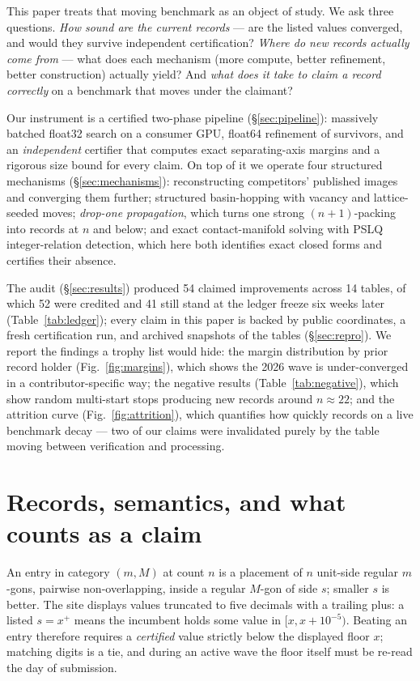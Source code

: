 \documentclass[11pt]{article}
\newcommand{\s}{\ensuremath{s}}
\begin{document}
This paper treats that moving benchmark as an object of study. We ask three
questions. \emph{How sound are the current records} --- are the listed values
converged, and would they survive independent certification?
\emph{Where do new records actually come from} --- what does each mechanism
(more compute, better refinement, better construction) actually yield? And
\emph{what does it take to claim a record correctly} on a benchmark that moves
under the claimant?

Our instrument is a certified two-phase pipeline (\S\ref{sec:pipeline}):
massively batched float32 search on a consumer GPU, float64 refinement of
survivors, and an \emph{independent} certifier that computes exact
separating-axis margins and a rigorous size bound for every claim. On top of it
we operate four structured mechanisms (\S\ref{sec:mechanisms}): reconstructing
competitors' published images and converging them further; structured
basin-hopping with vacancy and lattice-seeded moves; \emph{drop-one
propagation}, which turns one strong $(n{+}1)$-packing into records at $n$ and
below; and exact contact-manifold solving with PSLQ integer-relation detection,
which here both identifies exact closed forms and certifies their absence.

The audit (\S\ref{sec:results}) produced 54 claimed improvements across 14
tables, of which 52 were credited and 41 still stand at the ledger freeze six
weeks later (Table~\ref{tab:ledger}); every claim in this paper is backed by
public coordinates, a fresh certification run, and archived snapshots of the
tables (\S\ref{sec:repro}). We report the findings a trophy list would hide:
the margin distribution by prior record holder (Fig.~\ref{fig:margins}), which
shows the 2026 wave is under-converged in a contributor-specific way; the
negative results (Table~\ref{tab:negative}), which show random multi-start
stops producing new records around $n\approx22$; and the attrition curve
(Fig.~\ref{fig:attrition}), which quantifies how quickly records on a live
benchmark decay --- two of our claims were invalidated purely by the table
moving between verification and processing.

\section{Records, semantics, and what counts as a claim}\label{sec:semantics}

An entry in category $(m, M)$ at count $n$ is a placement of $n$ unit-side
regular $m$-gons, pairwise non-overlapping, inside a regular $M$-gon of side
$\s$; smaller $\s$ is better. The site displays values truncated to five
decimals with a trailing plus: a listed $\s = x^{+}$ means the incumbent holds
some value in $[x, x+10^{-5})$. Beating an entry therefore requires a
\emph{certified} value strictly below the displayed floor $x$; matching digits
is a tie, and during an active wave the floor itself must be re-read the day of
submission.
\end{document}

